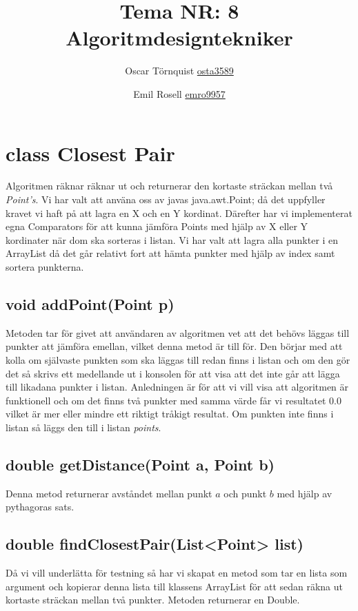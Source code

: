 \documentclass[a5paper,10pt,oneside]{article}
\title{Tema NR: 8 Algoritmdesigntekniker}
\author{Oscar Törnquist \url{osta3589} \and Emil Rosell \url{emro9957}}
\begin{document}
\maketitle

\section{class Closest Pair}
Algoritmen räknar räknar ut och returnerar den kortaste sträckan mellan två \textit{Point's}. Vi har valt att använa oss av javas java.awt.Point; då det uppfyller kravet vi haft på att lagra en X och en Y kordinat. Därefter har vi implementerat egna Comparators för att kunna jämföra Points med hjälp av X eller Y kordinater när dom ska sorteras i listan. Vi har valt att lagra alla punkter i en ArrayList då det går relativt fort att hämta punkter med hjälp av index samt sortera punkterna.

\subsection{void addPoint(Point p)}
Metoden tar för givet att användaren av algoritmen vet att det behövs läggas till punkter att jämföra emellan, vilket denna metod är till för. Den börjar med att kolla om självaste punkten som ska läggas till redan finns i listan och om den gör det så skrivs ett medellande ut i konsolen för att visa att det inte går att lägga till likadana punkter i listan. Anledningen är för att vi vill visa att algoritmen är funktionell och om det finns två punkter med samma värde får vi resultatet $0.0$ vilket är mer eller mindre ett riktigt tråkigt resultat.
Om punkten inte finns i listan så läggs den till i listan \textit{points}.

\subsection{double getDistance(Point a, Point b)} 
Denna metod returnerar avståndet mellan punkt $a$ och punkt $b$ med hjälp av pythagoras sats. 

\subsection{double findClosestPair(List<Point> list)} 
Då vi vill underlätta för testning så har vi skapat en metod som tar en lista som argument och kopierar denna lista till klassens ArrayList för att sedan räkna ut kortaste sträckan mellan två punkter. 
Metoden returnerar en Double.
\end{document}
